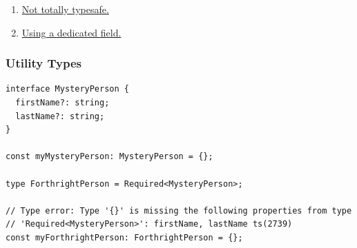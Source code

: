 \documentclass[aspectratio=169]{beamer}
\begin{document}
\begin{frame}[fragile]
\begin{enumerate}
    \item \href{https://www.typescriptlang.org/play?noUncheckedIndexedAccess=true&noUnusedLocals=true&noUnusedParameters=true#code/JYOwLgpgTgZghgYwgAgAoRMg3gKGcga1ABMAuZAZzClAHMBuPZUAgYQHsAbdqcqmkAyZgAFsAQEQEChT7U6jAL44coSLEQoAYuwCu4OKHSYIAD0ghiFNBmxMQwAEYAVAJ4AHCHIFD8MYJycdACyEAgicA4UALbeCjjKquDQ8EjIAEpcnNAA4hCcyGYWVjaYuPjAFOkQ1IhgcI7Z5I7sXBCRjPgI7FTdAIKVTcggutGO0Eoq3SBUzFVZufnIALzIABSeIOTGAJTkm3MZC1B5BcsAfEwbtnDWmYGLnDsAdJXVtQj1jSgAhMur+mIEH8UmIjBw01mFHCUHYxDo0AoxnIOn09SMtgAPkcHiclssmME4KJnlBIsR2NE1jtkOdkAAGZ4AViY+AA-HZ8FzCCRyAAiVABdhgZAANUilTEgjQ7DUfIANKyuSwONxeMg+QAJaCOUDIABC2V0yAAItI0LCYOxLBBdFAKAqlfhROJJNJZBrQvDRo7ufgHC4PF4NTkuMRfX7-IEQmEIlFYhrWHAoPJiLQUBwQAA3aDqCPct41MmfBpDai6CCK7nKbnkcp+oiWfmC7ginIAJnzypAbC4PH5horXedYgkUhk-MZAHZotFh3N3sWvmWoBWq37ur12AMKEMp+v8IpwcAYOs3sdTmtoSJYfDBIjdjT65C2s9uLQ1kqAAYASVPrj0ZAggIFBRGkFBaHYZAwCgjgt2QclkHTEU4GQRx9HCZBrQQwYUAAEiwa9bwRe1jGeTcwH6XDFC-JgdiUQpOAoFBn2tChX3fNYvwAOXEfDCJhOESKRDBngDNxPEUYYnB+L96ISHAgA}{Not totally typesafe.}
    \item \href{https://www.typescriptlang.org/play?noUncheckedIndexedAccess=true&noUnusedLocals=true&noUnusedParameters=true#code/KYOwrgtgBACqAqBPADsKBvAUFKAxA9mCAC4CGAliHCFALxQBEBRZl1DANNlAEr4A2-YACcA4sH51GfQSPH9OmAL6ZMlYiIBmpAMZpqGbgGtKAEwBcUAM7FhlAOYBubpSMBhAfmGWbdkE+5iAAtyHSMQYCsrH1sHZxxUECRUS2pk4GcVNRItXTRmEgoqUChgAA8NEFMrWBKsHBByACN0mL8AnE1yQQcAWWAdINJGqwg2uOVVdVy9XgEhMQlSitBq2pp6qHIrHmBbXTImoUsm-AFgYfioHXwbG4BBbeOocAgmkUzVG5Aba0HhfCmBwiKzUSwFVjFGgAHzmskWklo3F6pGCADphMNTPgIAAKACUUAAfFAAAxogCs3BwAH5DDgGVATFVLAwYN18MQoAA1YbbEL+WD4dSKRk4VwefheVkACRETUoUAAQkIwFAACKRWAAzT4KrAMDCKyisXBULhSLRRj9IGQE2MxotFDAVmiASme0Mro9fz9QZ80astykYSxUz2NAeEAANxEGmEnvFOz2mJ0h2etjAwC4YqgiVa63SaIhRWoOYZKkZlk2jOZFkY7KlXNEACZE1sQO5PN5GCqs+2zWEIlFWeSAOwQCDt7a7fZp0hHF1QTPZ6kMm53fCPKzPMflxn552pBDOtEyBbyfdQJTOTDfX4z+ZyJb0XGJY8gfGWRJbGrn5+IkS3CJGih6oHQtD0Gkp7-git7kJoUC4o+8LyLiVj-ICwJGtQ+KEps97nGiUr2Lia4AAYAJKIYghBQPw5BGGgwSRGg9j4MuHEeJuUBYlAEZcqQUBNEQgxQHqvFPGgAAk6AYUEAJAv4ILUGiG7EA8UlKOR3D4pkpT8FYaAEXqVhESRuLkQAcqEMlyZhSkRjhoBoo66RKC8zQAITkXpkxAA}{Using a dedicated field.}
  \end{enumerate}
\end{frame}


\begin{frame}[fragile]
  \frametitle{Utility Types}

  \begin{verbatim}
interface MysteryPerson {
  firstName?: string;
  lastName?: string;
}

const myMysteryPerson: MysteryPerson = {};

type ForthrightPerson = Required<MysteryPerson>;

// Type error: Type '{}' is missing the following properties from type
// 'Required<MysteryPerson>': firstName, lastName ts(2739)
const myForthrightPerson: ForthrightPerson = {};
  \end{verbatim}
\end{frame}
\end{document}
